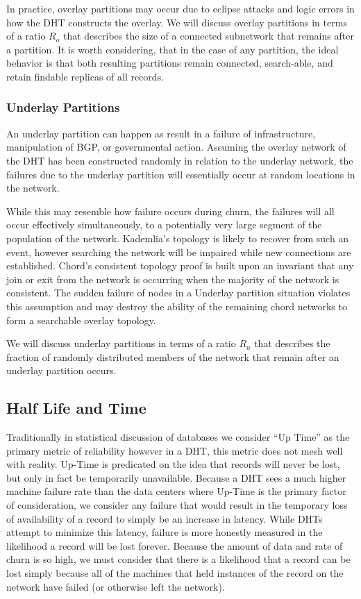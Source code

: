 \documentclass[conference]{IEEEtran}
\begin{document}
In practice, overlay partitions may occur due to eclipse attacks and logic errors in how the DHT constructs the overlay.
We will discuss overlay partitions in terms of a ratio $R_{o}$ that describes the size of a connected subnetwork that remains after a partition.
It is worth considering, that in the case of any partition, the ideal behavior is that both resulting partitions remain connected, search-able, and retain findable replicas of all records.


\subsubsection{Underlay Partitions}
An underlay partition can happen as result in a failure of infrastructure, manipulation of BGP, or governmental action.
Assuming the overlay network of the DHT has been constructed randomly in relation to the underlay network, the failures due to the underlay partition will essentially occur at random locations in the network. 


While this may resemble how failure occurs during churn, the failures will all occur effectively simultaneously, to a potentially very large segment of the population of the network.
Kademlia's topology is likely to recover from such an event, however searching the network will be impaired while new connections are established.
Chord's consistent topology proof is built upon an invariant that any join or exit from the network is occurring when the majority of the network is consistent. 
The sudden failure of nodes in a Underlay partition situation violates this assumption and may destroy the ability of the remaining chord networks to form a searchable overlay topology.

We will discuss underlay partitions in terms of a ratio $R_{u}$ that describes the fraction of randomly distributed members of the network that remain after an underlay partition occurs. 


\subsection{Half Life and Time}
Traditionally in statistical discussion of databases we consider ``Up Time'' as the primary metric of reliability however in a DHT, this metric does not mesh well with reality.
Up-Time is predicated on the idea that records will never be lost, but only in fact be temporarily unavailable.
Because a DHT sees a much higher machine failure rate than the data centers where Up-Time is the primary factor of consideration, we consider any failure that would result in the temporary loss of availability of a record to simply be an increase in latency.
While DHTs attempt to minimize this latency, failure is more honestly measured in the likelihood a record will be lost forever.
Because the amount of data and rate of churn is so high, we must consider that there is a likelihood that a record can be lost simply because all of the machines that held instances of the record on the network have failed (or otherwise left the network).
\end{document}
